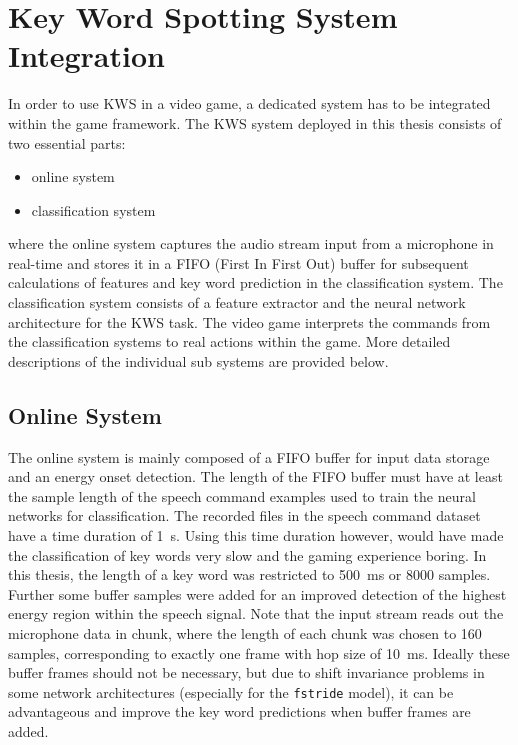
\section{Key Word Spotting System Integration}
\thesisStateReady
In order to use KWS in a video game, a dedicated system has to be integrated within the game framework.
The KWS system deployed in this thesis consists of two essential parts:
\begin{itemize}
	\item online system
	\item classification system
\end{itemize}
where the online system captures the audio stream input from a microphone in real-time and stores it in a FIFO (First In First Out) buffer for subsequent calculations of features and key word prediction in the classification system.
The classification system consists of a feature extractor and the neural network architecture for the KWS task.
The video game interprets the commands from the classification systems to real actions within the game.
More detailed descriptions of the individual sub systems are provided below.



\subsection{Online System}
The online system is mainly composed of a FIFO buffer for input data storage and an energy onset detection.
The length of the FIFO buffer must have at least the sample length of the speech command examples used to train the neural networks for classification.
The recorded files in the speech command dataset have a time duration of \SI{1}{\second}. 
Using this time duration however, would have made the classification of key words very slow and the gaming experience boring.
In this thesis, the length of a key word was restricted to \SI{500}{\milli\second} or 8000 samples.
Further some buffer samples were added for an improved detection of the highest energy region within the speech signal.
Note that the input stream reads out the microphone data in chunk, where the length of each chunk was chosen to 160 samples, corresponding to exactly one frame with hop size of \SI{10}{\milli\second}.
Ideally these buffer frames should not be necessary, but due to shift invariance problems in some network architectures (especially for the \texttt{fstride} model), it can be advantageous and improve the key word predictions when buffer frames are added.

